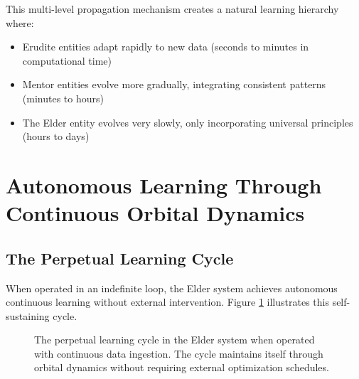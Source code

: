 This multi-level propagation mechanism creates a natural learning hierarchy where:
\begin{itemize}
    \item Erudite entities adapt rapidly to new data (seconds to minutes in computational time)
    \item Mentor entities evolve more gradually, integrating consistent patterns (minutes to hours)
    \item The Elder entity evolves very slowly, only incorporating universal principles (hours to days)
\end{itemize}

\section{Autonomous Learning Through Continuous Orbital Dynamics}

\subsection{The Perpetual Learning Cycle}

When operated in an indefinite loop, the Elder system achieves autonomous continuous learning without external intervention. Figure \ref{fig:perpetual_learning_cycle} illustrates this self-sustaining cycle.

\begin{figure}[h]
\centering
{}
\caption{The perpetual learning cycle in the Elder system when operated with continuous data ingestion. The cycle maintains itself through orbital dynamics without requiring external optimization schedules.}
\label{fig:perpetual_learning_cycle}
\end{figure}

